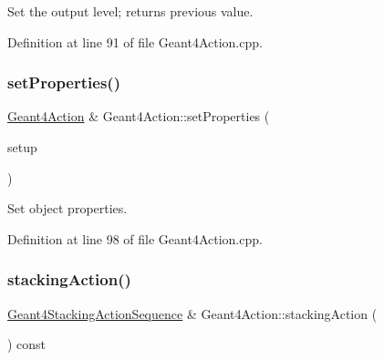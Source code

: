 Set the output level; returns previous value. 



Definition at line 91 of file Geant4\+Action.\+cpp.

\hypertarget{class_d_d4hep_1_1_simulation_1_1_geant4_action_af7cca1826781c1367ecc79c4225e09da}{}\label{class_d_d4hep_1_1_simulation_1_1_geant4_action_af7cca1826781c1367ecc79c4225e09da} 
\subsubsection{\texorpdfstring{set\+Properties()}{setProperties()}}
{\footnotesize\ttfamily \hyperlink{class_d_d4hep_1_1_simulation_1_1_geant4_action}{Geant4\+Action} \& Geant4\+Action\+::set\+Properties (\begin{DoxyParamCaption}\item[{\hyperlink{class_d_d4hep_1_1_property_configurator}{Property\+Configurator} \&}]{setup }\end{DoxyParamCaption})}



Set object properties. 



Definition at line 98 of file Geant4\+Action.\+cpp.

\hypertarget{class_d_d4hep_1_1_simulation_1_1_geant4_action_afdcb408fdab69261bdd9351c553e8103}{}\label{class_d_d4hep_1_1_simulation_1_1_geant4_action_afdcb408fdab69261bdd9351c553e8103} 
\subsubsection{\texorpdfstring{stacking\+Action()}{stackingAction()}}
{\footnotesize\ttfamily \hyperlink{class_d_d4hep_1_1_simulation_1_1_geant4_stacking_action_sequence}{Geant4\+Stacking\+Action\+Sequence} \& Geant4\+Action\+::stacking\+Action (\begin{DoxyParamCaption}{ }\end{DoxyParamCaption}) const}




